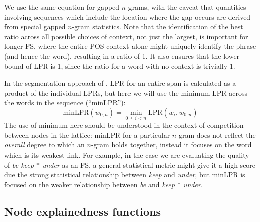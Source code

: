 \documentclass[11pt,letterpaper]{article}
\newcommand{\gap}{$*$\xspace}
\newcommand{\ex}[1]{\textit{#1}\xspace}
\newcommand{\LPR}{\ensuremath{\text{LPR}}}
\newcommand{\minLPR}{\ensuremath{\text{minLPR}}}
\begin{document}
We use the same equation for gapped $n$-grams, with the caveat that quantities involving sequences which include the location where the gap occurs are derived from special gapped $n$-gram statistics. Note that the identification of the best ratio across all possible choices of context, not just the largest, is important for longer FS, where the entire POS context alone might uniquely identify the phrase (and hence the word), resulting in a ratio of 1. 
It also ensures that the lower bound of LPR is 1, since the ratio for a word with no context is trivially 1.

In the segmentation approach of , LPR for an entire span is calculated as a product of the individual LPRs, but here we will use the minimum LPR across the words in the sequence (``\minLPR''):
\begin{displaymath}
\minLPR(w_{0,n}) = \min_{0 \leq i < n }{\LPR(w_i,w_{0,n})}
\end{displaymath}
The use of minimum here should be understood in the context of competition between nodes in the lattice: minLPR for a particular $n$-gram does not reflect the \emph{overall} degree to which an $n$-gram holds together, instead it focuses on the word which is its weakest link. For example, in the case we are evaluating the quality of \ex{be keep \gap under} as an FS, a general statistical metric might give it a high score due the strong statistical relationship between \ex{keep} and \ex{under}, but minLPR is focused on the weaker relationship between \ex{be} and \ex{keep \gap under}.


\subsection{Node explainedness functions}
\end{document}
